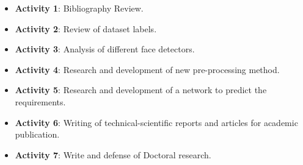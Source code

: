 \begin{itemize}
\item \textbf{Activity 1}: Bibliography Review.
\item \textbf{Activity 2}: Review of dataset labels.
\item \textbf{Activity 3}: Analysis of different face detectors.
\item \textbf{Activity 4}: Research and development of new pre-processing method.
\item \textbf{Activity 5}: Research and development of a network to predict the \citeReq{\eyecenterlocation} requirements.
\item \textbf{Activity 6}: Writing of technical-scientific reports and articles for academic publication.
\item \textbf{Activity 7}: Write and defense of Doctoral research.
\end{itemize}
